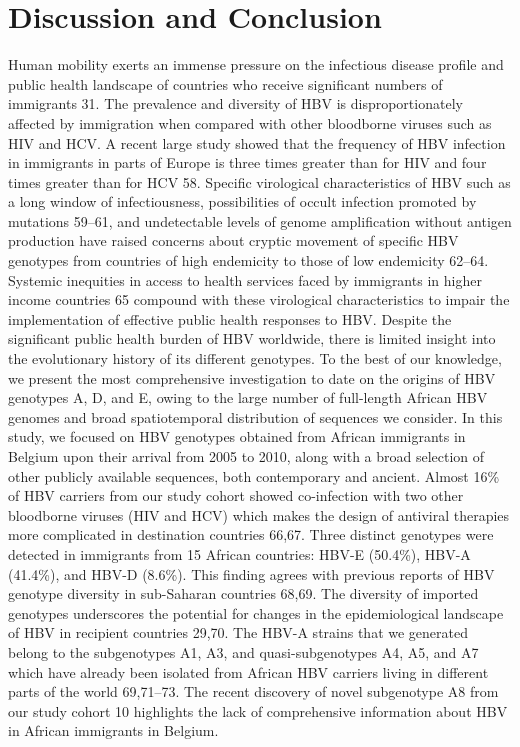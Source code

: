 \section{Discussion and Conclusion}
Human mobility exerts an immense pressure on the infectious disease profile and public health landscape of countries who receive significant numbers of immigrants 31. The prevalence and diversity of HBV is disproportionately affected by immigration when compared with other bloodborne viruses such as HIV and HCV. A recent large study showed that the frequency of HBV infection in immigrants in parts of Europe is three times greater than for HIV and four times greater than for HCV 58. Specific virological characteristics of HBV such as a long window of infectiousness, possibilities of occult infection promoted by mutations 59–61, and undetectable levels of genome amplification without antigen production have raised concerns about cryptic movement of specific HBV genotypes from countries of high endemicity to those of low endemicity 62–64. Systemic inequities in access to health services faced by immigrants in higher income countries 65 compound with these virological characteristics to impair the implementation of effective public health responses to HBV.
Despite the significant public health burden of HBV worldwide, there is limited insight into the evolutionary history of its different genotypes. To the best of our knowledge, we present the most comprehensive investigation to date on the origins of HBV genotypes A, D, and E, owing to the large number of full-length African HBV genomes and broad spatiotemporal distribution of sequences we consider. In this study, we focused on HBV genotypes obtained  from African immigrants in Belgium upon their arrival from 2005 to 2010, along with  a broad selection of other publicly available sequences, both contemporary and ancient. Almost 16\% of HBV carriers from our study cohort showed co-infection with two other bloodborne viruses (HIV and HCV) which makes the design of antiviral therapies more complicated in destination countries 66,67. Three distinct genotypes were detected in immigrants from 15 African countries: HBV-E (50.4\%), HBV-A (41.4\%), and HBV-D (8.6\%). This finding agrees with previous reports of HBV genotype diversity in sub-Saharan countries 68,69. The diversity of  imported genotypes underscores the potential for changes in the epidemiological landscape of HBV in recipient countries 29,70. The HBV-A strains that we generated belong to the subgenotypes A1, A3, and quasi-subgenotypes A4, A5, and A7 which have already been isolated from African HBV carriers living in different parts of the world 69,71–73. The recent discovery of novel subgenotype A8 from our study cohort 10 highlights the lack of comprehensive information about HBV in African immigrants in Belgium. 
